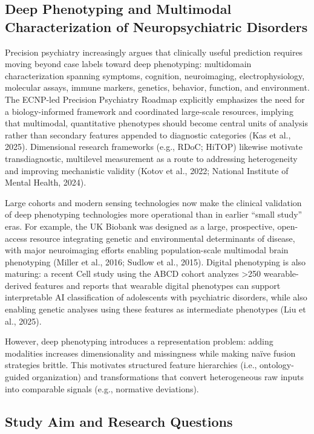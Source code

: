 \documentclass[11pt,a4paper,twoside]{article}
\begin{document}
\subsection{Deep Phenotyping and Multimodal Characterization of Neuropsychiatric Disorders}

Precision psychiatry increasingly argues that clinically useful prediction requires moving beyond case labels toward deep phenotyping: multidomain characterization spanning symptoms, cognition, neuroimaging, electrophysiology, molecular assays, immune markers, genetics, behavior, function, and environment. The ECNP-led Precision Psychiatry Roadmap explicitly emphasizes the need for a biology-informed framework and coordinated large-scale resources, implying that multimodal, quantitative phenotypes should become central units of analysis rather than secondary features appended to diagnostic categories (Kas et al., 2025). Dimensional research frameworks (e.g., RDoC; HiTOP) likewise motivate transdiagnostic, multilevel measurement as a route to addressing heterogeneity and improving mechanistic validity (Kotov et al., 2022; National Institute of Mental Health, 2024).

Large cohorts and modern sensing technologies now make the clinical validation of deep phenotyping technologies more operational than in earlier ``small study'' eras. For example, the UK Biobank was designed as a large, prospective, open-access resource integrating genetic and environmental determinants of disease, with major neuroimaging efforts enabling population-scale multimodal brain phenotyping (Miller et al., 2016; Sudlow et al., 2015). Digital phenotyping is also maturing: a recent Cell study using the ABCD cohort analyzes >250 wearable-derived features and reports that wearable digital phenotypes can support interpretable AI classification of adolescents with psychiatric disorders, while also enabling genetic analyses using these features as intermediate phenotypes (Liu et al., 2025).

However, deep phenotyping introduces a representation problem: adding modalities increases dimensionality and missingness while making naïve fusion strategies brittle. This motivates structured feature hierarchies (i.e., ontology-guided organization) and transformations that convert heterogeneous raw inputs into comparable signals (e.g., normative deviations).

\subsection{Study Aim and Research Questions}
\end{document}
